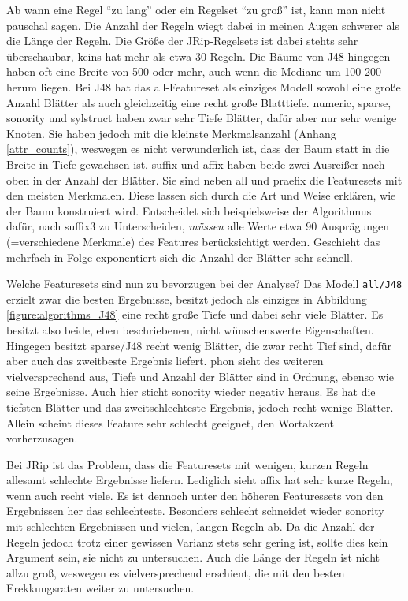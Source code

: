 Ab wann eine Regel \enquote{zu lang} oder ein Regelset \enquote{zu groß} ist, kann man nicht pauschal sagen. Die Anzahl der Regeln wiegt dabei in meinen Augen schwerer als die Länge der Regeln. Die Größe der JRip-Regelsets ist dabei stehts sehr überschaubar, keins hat mehr als etwa 30 Regeln. Die Bäume von J48 hingegen haben oft eine Breite von 500 oder mehr, auch wenn die Mediane um 100-200 herum liegen.
Bei J48 hat das all-Featureset als einziges Modell sowohl eine große Anzahl Blätter als auch gleichzeitig eine recht große Blatttiefe. numeric, sparse, sonority und sylstruct haben zwar sehr Tiefe Blätter, dafür aber nur sehr wenige Knoten. Sie haben jedoch mit die kleinste Merkmalsanzahl (Anhang \ref{attr_counts}), weswegen es nicht verwunderlich ist, dass der Baum statt in die Breite in Tiefe gewachsen ist.
suffix und affix haben beide zwei Ausreißer nach oben in der Anzahl der Blätter. Sie sind neben all und praefix die Featuresets mit den meisten Merkmalen. Diese lassen sich durch die Art und Weise erklären, wie der Baum konstruiert wird. Entscheidet sich beispielsweise der Algorithmus dafür, nach suffix3 zu Unterscheiden, \textit{müssen} alle Werte etwa 90 Ausprägungen (=verschiedene Merkmale) des Features berücksichtigt werden. Geschieht das mehrfach in Folge exponentiert sich die Anzahl der Blätter sehr schnell.

Welche Featuresets sind nun zu bevorzugen bei der Analyse? Das Modell \texttt{all/J48} erzielt zwar die besten Ergebnisse, besitzt jedoch als einziges in Abbildung \ref{figure:algorithms_J48} eine recht große Tiefe und dabei sehr viele Blätter. Es besitzt also beide, eben beschriebenen, nicht wünschenswerte Eigenschaften. Hingegen besitzt sparse/J48 recht wenig Blätter, die zwar recht Tief sind, dafür aber auch das zweitbeste Ergebnis liefert. phon sieht des weiteren vielversprechend aus, Tiefe und Anzahl der Blätter sind in Ordnung, ebenso wie seine Ergebnisse.
Auch hier sticht sonority wieder negativ heraus. Es hat die tiefsten Blätter und das zweitschlechteste Ergebnis, jedoch recht wenige Blätter. Allein scheint dieses Feature sehr schlecht geeignet, den Wortakzent vorherzusagen.  

Bei JRip ist das Problem, dass die Featuresets mit wenigen, kurzen Regeln allesamt schlechte Ergebnisse liefern. Lediglich sieht affix hat sehr kurze Regeln, wenn auch recht viele. Es ist dennoch unter den höheren Featuressets von den Ergebnissen her das schlechteste. Besonders schlecht schneidet wieder sonority mit schlechten Ergebnissen und vielen, langen Regeln ab. Da die Anzahl der Regeln jedoch trotz einer gewissen Varianz stets sehr gering ist, sollte dies kein Argument sein, sie nicht zu untersuchen. Auch die Länge der Regeln ist nicht allzu groß, weswegen es vielversprechend erschient, die mit den besten Erekkungsraten weiter zu untersuchen.

